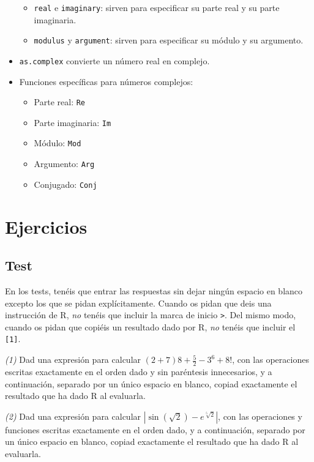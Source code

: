 \documentclass[
]{book}
\providecommand{\tightlist}{%
  \setlength{\itemsep}{0pt}\setlength{\parskip}{0pt}}
\theoremstyle{definition}
\theoremstyle{definition}
\theoremstyle{definition}
\theoremstyle{remark}
\begin{document}
\begin{itemize}
  \begin{itemize}
  \tightlist
  \item
    \texttt{real} e \texttt{imaginary}: sirven para especificar su parte real y su parte imaginaria.
  \item
    \texttt{modulus} y \texttt{argument}: sirven para especificar su módulo y su argumento.
  \end{itemize}
\item
  \texttt{as.complex} convierte un número real en complejo.
\item
  Funciones específicas para números complejos:

  \begin{itemize}
  \tightlist
  \item
    Parte real: \texttt{Re}
  \item
    Parte imaginaria: \texttt{Im}
  \item
    Módulo: \texttt{Mod}
  \item
    Argumento: \texttt{Arg}
  \item
    Conjugado: \texttt{Conj}
  \end{itemize}
\end{itemize}

\hypertarget{ejercicios}{%
\section{Ejercicios}\label{ejercicios}}

\hypertarget{test}{%
\subsection*{Test}\label{test}}

En los tests, tenéis que entrar las respuestas sin dejar ningún espacio en blanco excepto los que se pidan explícitamente. Cuando os pidan que deis una instrucción de R, \emph{no} tenéis que incluir la marca de inicio \texttt{\textgreater{}}. Del mismo modo, cuando os pidan que copiéis un resultado dado por R, \emph{no} tenéis que incluir el \texttt{{[}1{]}}.

\emph{(1)} Dad una expresión para calcular \((2+7)8+\frac{5}{2}-3^6+8!\), con las operaciones escritas exactamente en el orden dado y sin paréntesis innecesarios, y a continuación, separado por un único espacio en blanco, copiad exactamente el resultado que ha dado R al evaluarla.

\emph{(2)} Dad una expresión para calcular \(|\sin(\sqrt{2})-e^{\sqrt[5]{2}}|\), con las operaciones y funciones escritas exactamente en el orden dado, y a continuación, separado por un único espacio en blanco, copiad exactamente el resultado que ha dado R al evaluarla.
\end{document}
